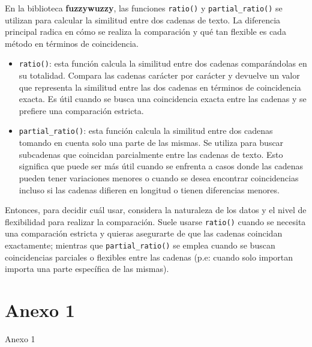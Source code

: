 \documentclass[
  a4paper,
  DIV=11,
  numbers=noendperiod]{scrreprt}
\providecommand{\tightlist}{%
  \setlength{\itemsep}{0pt}\setlength{\parskip}{0pt}}\usepackage{longtable,booktabs,array}
\begin{document}
En la biblioteca \textbf{fuzzywuzzy}, las funciones \texttt{ratio()} y
\texttt{partial\_ratio()} se utilizan para calcular la similitud entre
dos cadenas de texto. La diferencia principal radica en cómo se realiza
la comparación y qué tan flexible es cada método en términos de
coincidencia.

\begin{itemize}
\tightlist
\item
  \texttt{ratio()}: esta función calcula la similitud entre dos cadenas
  comparándolas en su totalidad. Compara las cadenas carácter por
  carácter y devuelve un valor que representa la similitud entre las dos
  cadenas en términos de coincidencia exacta. Es útil cuando se busca
  una coincidencia exacta entre las cadenas y se prefiere una
  comparación estricta.
\item
  \texttt{partial\_ratio()}: esta función calcula la similitud entre dos
  cadenas tomando en cuenta solo una parte de las mismas. Se utiliza
  para buscar subcadenas que coincidan parcialmente entre las cadenas de
  texto. Esto significa que puede ser más útil cuando se enfrenta a
  casos donde las cadenas pueden tener variaciones menores o cuando se
  desea encontrar coincidencias incluso si las cadenas difieren en
  longitud o tienen diferencias menores.
\end{itemize}

Entonces, para decidir cuál usar, considera la naturaleza de los datos y
el nivel de flexibilidad para realizar la comparación. Suele usarse
\texttt{ratio()} cuando se necesita una comparación estricta y quieras
asegurarte de que las cadenas coincidan exactamente; mientras que
\texttt{partial\_ratio()} se emplea cuando se buscan coincidencias
parciales o flexibles entre las cadenas (p.e: cuando solo importan
importa una parte específica de las mismas).

\cleardoublepage
{}
{}
\appendix

\chapter{Anexo 1}\label{anexo-1}

Anexo 1


\printbibliography


\printindex
\end{document}
